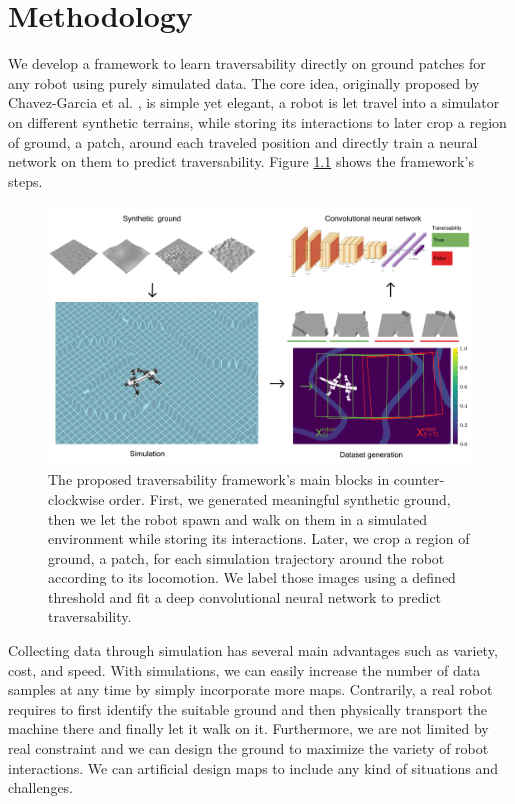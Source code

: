 \documentclass[../document.tex]{subfiles}
\begin{document}
\chapter{Methodology}
We develop a framework to learn traversability directly on ground patches for any robot using purely simulated data. The core idea, originally proposed by Chavez-Garcia et al. \cite{omar2018traversability}, is simple yet elegant, a robot is let travel into a simulator on different synthetic terrains, while storing its interactions to later crop a region of ground, a patch, around each traveled position and directly train a neural network on them to predict traversability. Figure \ref{fig : pipeline} shows the framework's steps.
\begin{figure}[H]
    \centering
        \includegraphics[width=\textwidth]{../img/method.png}
    \caption{The proposed traversability framework's main blocks in counter-clockwise order. First, we generated meaningful synthetic ground, then we let the robot spawn and walk on them in a simulated environment while storing its interactions. Later, we crop a region of ground, a patch, for each simulation trajectory around the robot according to its locomotion. We label those images using a defined threshold and fit a deep convolutional neural network to predict traversability. }
    \label{fig : pipeline}
    \end{figure}
Collecting data through simulation has several main advantages such as variety, cost, and speed. With simulations, we can easily increase the number of data samples at any time by simply incorporate more maps. Contrarily, a real robot requires to first identify the suitable ground and then physically transport the machine there and finally let it walk on it.
Furthermore, we are not limited by real constraint and we can design the ground to maximize the variety of robot interactions. We can artificial design maps to include any kind of situations and challenges.
\end{document}
